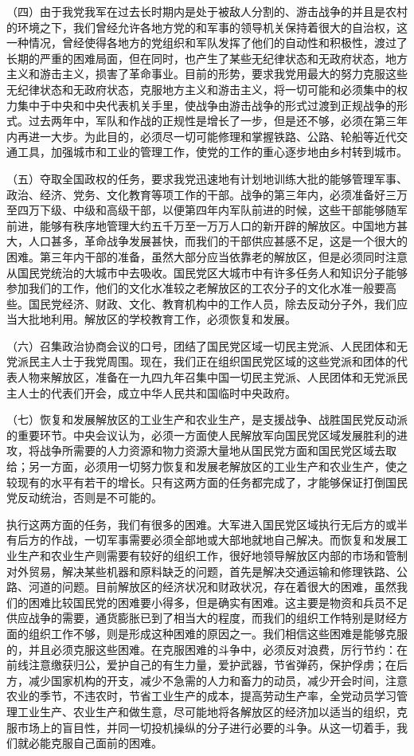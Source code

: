（四）由于我党我军在过去长时期内是处于被敌人分割的、游击战争的并且是农村的环境之下，我们曾经允许各地方党的和军事的领导机关保持着很大的自治权，这一种情况，曾经使得各地方的党组织和军队发挥了他们的自动性和积极性，渡过了长期的严重的困难局面，但在同时，也产生了某些无纪律状态和无政府状态，地方主义和游击主义，损害了革命事业。目前的形势，要求我党用最大的努力克服这些无纪律状态和无政府状态，克服地方主义和游击主义，将一切可能和必须集中的权力集中于中央和中央代表机关手里，使战争由游击战争的形式过渡到正规战争的形式。过去两年中，军队和作战的正规性是增长了一步，但是还不够，必须在第三年内再进一大步。为此目的，必须尽一切可能修理和掌握铁路、公路、轮船等近代交通工具，加强城市和工业的管理工作，使党的工作的重心逐步地由乡村转到城市。

（五）夺取全国政权的任务，要求我党迅速地有计划地训练大批的能够管理军事、政治、经济、党务、文化教育等项工作的干部。战争的第三年内，必须准备好三万至四万下级、中级和高级干部，以便第四年内军队前进的时候，这些干部能够随军前进，能够有秩序地管理大约五千万至一万万人口的新开辟的解放区。中国地方甚大，人口甚多，革命战争发展甚快，而我们的干部供应甚感不足，这是一个很大的困难。第三年内干部的准备，虽然大部分应当依靠老的解放区，但是必须同时注意从国民党统治的大城市中去吸收。国民党区大城市中有许多任务人和知识分子能够参加我们的工作，他们的文化水准较之老解放区的工农分子的文化水准一般要高些。国民党经济、财政、文化、教育机构中的工作人员，除去反动分子外，我们应当大批地利用。解放区的学校教育工作，必须恢复和发展。

（六）召集政治协商会议的口号，团结了国民党区域一切民主党派、人民团体和无党派民主人士于我党周围。现在，我们正在组织国民党区域的这些党派和团体的代表人物来解放区，准备在一九四九年召集中国一切民主党派、人民团体和无党派民主人士的代表们开会，成立中华人民共和国临时中央政府。

（七）恢复和发展解放区的工业生产和农业生产，是支援战争、战胜国民党反动派的重要环节。中央会议认为，必须一方面使人民解放军向国民党区域发展胜利的进攻，将战争所需要的人力资源和物力资源大量地从国民党方面和国民党区域去取给；另一方面，必须用一切努力恢复和发展老解放区的工业生产和农业生产，使之较现有的水平有若干的增长。只有这两方面的任务都完成了，才能够保证打倒国民党反动统治，否则是不可能的。

执行这两方面的任务，我们有很多的困难。大军进入国民党区域执行无后方的或半有后方的作战，一切军事需要必须全部地或大部地就地自己解决。而恢复和发展工业生产和农业生产则需要有较好的组织工作，很好地领导解放区内部的市场和管制对外贸易，解决某些机器和原料缺乏的问题，首先是解决交通运输和修理铁路、公路、河道的问题。目前解放区的经济状况和财政状况，存在着很大的困难，虽然我们的困难比较国民党的困难要小得多，但是确实有困难。这主要是物资和兵员不足供应战争的需要，通货膨胀已到了相当大的程度，而我们的组织工作特别是财经方面的组织工作不够，则是形成这种困难的原因之一。我们相信这些困难是能够克服的，并且必须克服这些困难。在克服困难的斗争中，必须反对浪费，厉行节约：在前线注意缴获归公，爱护自己的有生力量，爱护武器，节省弹药，保护俘虏；在后方，减少国家机构的开支，减少不急需的人力和畜力的动员，减少开会时间，注意农业的季节，不违农时，节省工业生产的成本，提高劳动生产率，全党动员学习管理工业生产、农业生产和做生意，尽可能地将各解放区的经济加以适当的组织，克服市场上的盲目性，并同一切投机操纵的分子进行必要的斗争。从这一切着手，我们就必能克服自己面前的困难。


